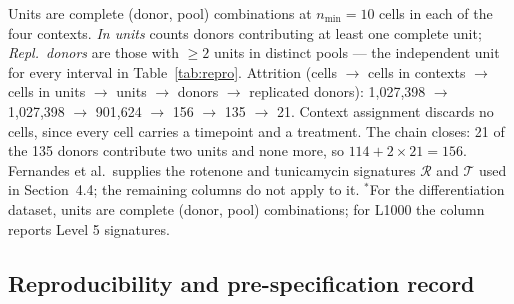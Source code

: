\documentclass[5p,times,twocolumn]{elsarticle}
\begin{document}
\begin{table}[!htbp]
  \centering
  \caption{Cohort construction and derived unit counts.}
  \label{tab:cohort}
  \begin{minipage}{\linewidth}\footnotesize
  Units are complete (donor, pool) combinations at $n_{\min}=10$ cells in each of the four contexts. \emph{In units} counts donors contributing at least one complete unit; \emph{Repl.\ donors} are those with $\geq 2$ units in distinct pools --- the independent unit for every interval in Table~\ref{tab:repro}. Attrition (cells $\rightarrow$ cells in contexts $\rightarrow$ cells in units $\rightarrow$ units $\rightarrow$ donors $\rightarrow$ replicated donors): 1,027,398 $\rightarrow$ 1,027,398 $\rightarrow$ 901,624 $\rightarrow$ 156 $\rightarrow$ 135 $\rightarrow$ 21. Context assignment discards no cells, since every cell carries a timepoint and a treatment. The chain closes: 21 of the 135 donors contribute two units and none more, so $114 + 2\times21 = 156$. Fernandes et al.\ supplies the rotenone and tunicamycin signatures $\mathcal{R}$ and $\mathcal{T}$ used in Section~4.4; the remaining columns do not apply to it. $^{\ast}$For the differentiation dataset, units are complete (donor, pool) combinations; for L1000 the column reports Level 5 signatures.
  \end{minipage}
\end{table}



\subsection{\textbf{Reproducibility and pre-specification record}}
\label{sec:repro}
\end{document}
